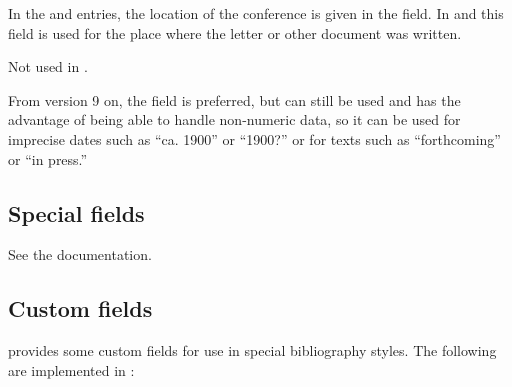 \documentclass{ltxdockit}[2010/02/12]
\begin{document}
\begin{fieldlist}

In the  and  entries, the location of the conference is given in the  field. In  and  this field is used for the place where the letter or other document was written.


Not used in .


From  version 9 on, the  field is preferred, but  can still be used and has the advantage of being able to handle non-numeric data, so it can be used for imprecise dates such as ``ca. 1900'' or ``1900?'' or for texts such as ``forthcoming'' or ``in press.''

\end{fieldlist}

\subsection{Special fields}

See the  documentation.

\subsection{Custom fields}

 provides some custom fields for use in special bibliography styles. The following are implemented in :
\end{document}
